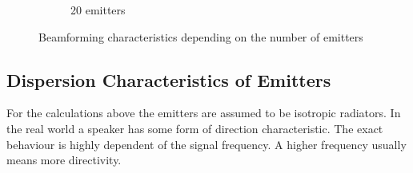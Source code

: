 \begin{figure}[ht]
\begin{subfigure}[b]{0.32\textwidth}
    \caption{20 emitters}
    \label{fig:theory:beam:num_20}
  \end{subfigure}
  \caption{Beamforming characteristics depending on the number of emitters}
  \label{fig:theory:beam:num}
\end{figure}
%
\subsection{Dispersion Characteristics of Emitters}
For the calculations above the emitters are assumed to be isotropic radiators. In the real world a speaker has some form of direction characteristic. The exact behaviour is highly dependent of the signal frequency. A higher frequency usually means more directivity.\cite{cox_frequency-dependent_2007}\cite{hill_frequency_2014}\p
%
%
%
